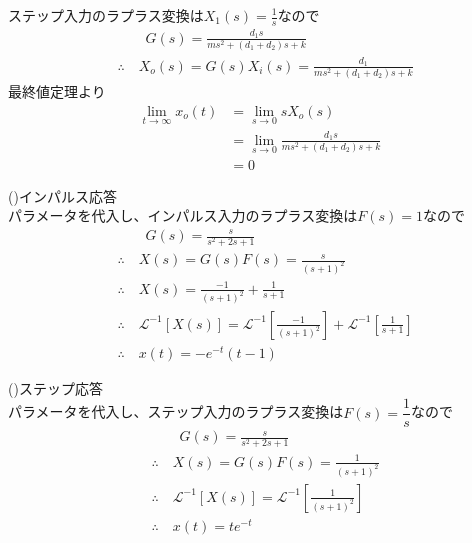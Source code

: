 \documentclass[a4paper,12pt]{article}
\begin{document}
\begin{tcolorbox}[title={5. (2)\(x_1(t)\)に単位ステップ入力を印加した際の応答について、\(x_2(t)\)の定常値を求めよ。 
    }]

            ステップ入力のラプラス変換は\(X_1(s)=\frac{1}{s}\)なので
    \vspace{-4mm}
    \begin{align*}
        &\qquad G(s) = \frac{d_1 s}{m s^2 +(d_1+d_2) s + k} \\
        &\therefore \quad X_o(s) = G(s) X_i(s) = \frac{d_1}{m s^2 +(d_1+d_2) s + k}
    \end{align*}
    最終値定理より
    \vspace{-4mm}
    \begin{align*}
    \lim_{t \to \infty} x_o(t) &= \lim_{s \to 0} sX_o(s) \\
        &= \lim_{s \to 0} \frac{d_1 s}{m s^2 +(d_1+d_2) s + k} \\
        &= 0
    \end{align*}
\end{tcolorbox}

\begin{tcolorbox}[title={5. (3)\(m=1,d_1=1,d_2=1,k=1\)とし、インパルス応答、ステップ応答をそれぞれ\\
\indent \quad 求めよ。}]

(\uppercase\expandafter{})インパルス応答 \\
    パラメータを代入し、インパルス入力のラプラス変換は\(F(s)=1\)なので
    \vspace{-2mm}
    \begin{align*}
        &\qquad G(s) = \frac{s}{s^2 + 2 s + 1 } \\
        &\therefore \quad X(s) = G(s) F(s) = \frac{s}{(s+1)^2} \\
        &\therefore \quad X(s) = \frac{-1}{(s+1)^2} + \frac{1}{s+1} \\
        &\therefore \quad \mathcal{L}^{-1} \left[ X(s)\right] 
        =\mathcal{L}^{-1} \left[\frac{-1}{(s+1)^2}\right] 
        + \mathcal{L}^{-1} \left[\frac{1}{s+1}\right] \\
        &\therefore \quad x(t) = - e^{-t} (t-1) 
    \end{align*}

    (\uppercase\expandafter{})ステップ応答 \\
    パラメータを代入し、ステップ入力のラプラス変換は\(F(s)=\dfrac{1}{s}\)なので
    \vspace{-2mm}
    \begin{align*}
        &\qquad G(s) = \frac{s}{s^2 + 2 s + 1 } \\
        &\therefore \quad X(s) = G(s) F(s) = \frac{1}{(s+1)^2} \\
        &\therefore \quad \mathcal{L}^{-1} \left[ X(s)\right] 
        =\mathcal{L}^{-1} \left[\frac{1}{(s+1)^2}\right] \\
        &\therefore \quad x(t) = te^{-t} 
    \end{align*}

\end{tcolorbox}
\end{document}

